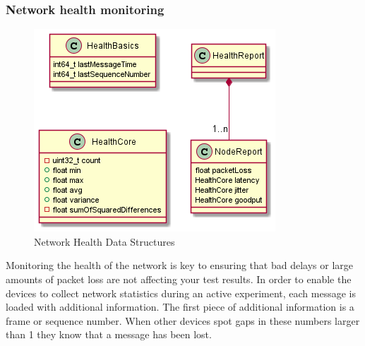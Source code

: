 \documentclass[letterpaper,twocolumn,10pt]{article}
\begin{document}
\subsubsection{Network health monitoring}\label{sec:nethealth}
\begin{figure}[t!]
    \centering
    \includegraphics[width=\linewidth]{out/images/network_health/network_health.png}
    \caption{Network Health Data Structures}
    \label{fig:network_health_ds}
\end{figure}
Monitoring the health of the network is key to ensuring that bad delays or large amounts of packet loss are not affecting your test results. In order to enable the devices to collect network statistics during an active experiment, each message is loaded with additional information. The first piece of additional information is a frame or sequence number. When other devices spot gaps in these numbers larger than 1 they know that a message has been lost.
\end{document}
